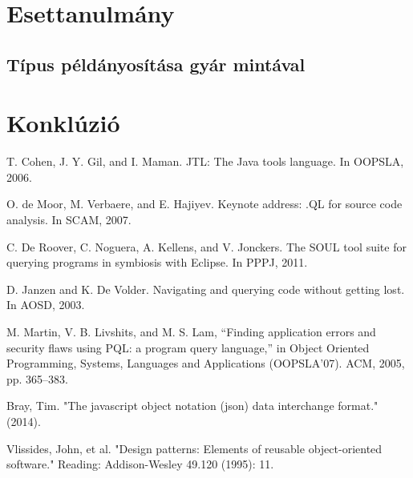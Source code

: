 \documentclass[a4paper,12pt]{report}
\begin{document}
\chapter{Esettanulmány}
\section{Típus példányosítása gyár mintával}

\chapter{Konklúzió}

\begin{thebibliography}{99}
	 T. Cohen, J. Y. Gil, and I. Maman. JTL: The Java tools
	language. In OOPSLA, 2006.
	
	 O. de Moor, M. Verbaere, and E. Hajiyev. Keynote address:
	.QL for source code analysis. In SCAM, 2007.
	
	 C. De Roover, C. Noguera, A. Kellens, and V. Jonckers. The
	SOUL tool suite for querying programs in symbiosis with
	Eclipse. In PPPJ, 2011.
	
	 D. Janzen and K. De Volder. Navigating and querying code
	without getting lost. In AOSD, 2003.
	
	  M. Martin, V. B. Livshits, and M. S. Lam, “Finding application
	errors and security flaws using PQL: a program query language,” 
	in Object Oriented Programming, Systems, Languages and Applications (OOPSLA’07). ACM, 2005, pp.	365–383.
	
	Bray, Tim. "The javascript object notation (json) data interchange format." (2014).
	
	 Vlissides, John, et al. "Design patterns: Elements of reusable object-oriented software." Reading: Addison-Wesley 49.120 (1995): 11.
	
\end{thebibliography}
	
\end{document}
